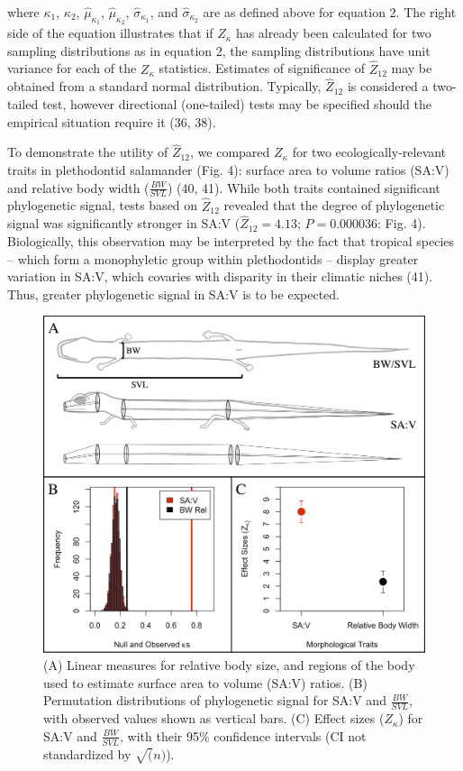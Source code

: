 \documentclass[9pt,twocolumn,twoside,lineno]{pnas-new}
\begin{document}
where \(\kappa_1\), \(\kappa_2\), \(\hat\mu_{\kappa_1}\),
\(\hat\mu_{\kappa_2}\), \(\hat\sigma_{\kappa_1}\), and
\(\hat\sigma_{\kappa_2}\) are as defined above for equation 2. The right
side of the equation illustrates that if \(Z_\kappa\) has already been
calculated for two sampling distributions as in equation 2, the sampling
distributions have unit variance for each of the \(Z_\kappa\)
statistics. Estimates of significance of \(\hat{Z}_{12}\) may be
obtained from a standard normal distribution. Typically,
\(\hat{Z}_{12}\) is considered a two-tailed test, however directional
(one-tailed) tests may be specified should the empirical situation
require it (36, 38).

To demonstrate the utility of \(\hat{Z}_{12}\), we compared
\(Z_{\kappa}\) for two ecologically-relevant traits in plethodontid
salamander (Fig. 4): surface area to volume ratios (SA:V) and relative
body width (\(\frac{BW}{SVL}\)) (40, 41). While both traits contained
significant phylogenetic signal, tests based on \(\hat{Z}_{12}\)
revealed that the degree of phylogenetic signal was significantly
stronger in SA:V (\(\hat{Z}_{12}=4.13\); \(P=0.000036\): Fig. 4).
Biologically, this observation may be interpreted by the fact that
tropical species -- which form a monophyletic group within plethodontids
-- display greater variation in SA:V, which covaries with disparity in
their climatic niches (41). Thus, greater phylogenetic signal in SA:V is
to be expected.

\begin{figure}
\centering
\includegraphics{fig.4.png}
\caption{(A) Linear measures for relative body size, and regions of the
body used to estimate surface area to volume (SA:V) ratios. (B)
Permutation distributions of phylogenetic signal for SA:V and
\(\frac{BW}{SVL}\), with observed values shown as vertical bars. (C)
Effect sizes (\(Z_\kappa\)) for SA:V and \(\frac{BW}{SVL}\), with their
95\% confidence intervals (CI not standardized by \(\sqrt(n)\)).{}}
\end{figure}
\end{document}

